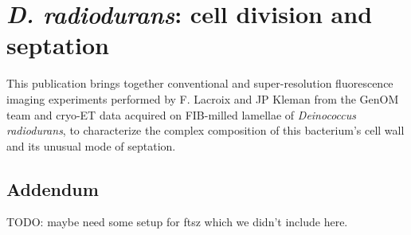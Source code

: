 \chapter{\textit{D. radiodurans}: cell division and septation}\label{drad}

This publication brings together conventional and super-resolution fluorescence imaging experiments performed by F. Lacroix and JP Kleman from the GenOM team and cryo-ET data acquired on FIB-milled lamellae of \textit{Deinococcus radiodurans}, to characterize the complex composition of this bacterium's cell wall and its unusual mode of septation.

\localtableofcontents
\newpage

\newpage

\section{Addendum}

TODO: maybe need some setup for ftsz which we didn't include here.
